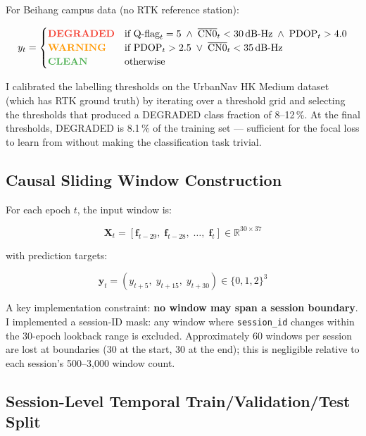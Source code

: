 \documentclass[12pt,a4paper]{article}
\newcommand{\code}[1]{\texttt{#1}}
\newcommand{\clean}[1]{\textcolor{cleanGreen}{\textbf{#1}}}
\newcommand{\warn}[1]{\textcolor{warnOrange}{\textbf{#1}}}
\newcommand{\degrad}[1]{\textcolor{degradRed}{\textbf{#1}}}
\begin{document}
For Beihang campus data (no RTK reference station):

\begin{equation}
  y_t = \begin{cases}
    \degrad{\text{DEGRADED}} &
    \text{if Q-flag}_t = 5 \;\land\;
    \overline{\text{CN0}}_t < 30\,\text{dB-Hz} \;\land\;
    \text{PDOP}_t > 4.0 \\
    \warn{\text{WARNING}} &
    \text{if PDOP}_t > 2.5 \;\lor\;
    \overline{\text{CN0}}_t < 35\,\text{dB-Hz} \\
    \clean{\text{CLEAN}} & \text{otherwise}
  \end{cases}
\end{equation}

I calibrated the labelling thresholds on the UrbanNav HK Medium dataset (which has RTK
ground truth) by iterating over a threshold grid and selecting the thresholds that
produced a DEGRADED class fraction of 8--12\,\%.
At the final thresholds, DEGRADED is 8.1\,\% of the training set --- sufficient for the
focal loss to learn from without making the classification task trivial.

\subsection{Causal Sliding Window Construction}

For each epoch $t$, the input window is:

\begin{equation}
  \mathbf{X}_t = [\mathbf{f}_{t-29},\; \mathbf{f}_{t-28},\; \ldots,\; \mathbf{f}_t]
  \in \mathbb{R}^{30 \times 37}
\end{equation}

with prediction targets:

\begin{equation}
  \mathbf{y}_t = (y_{t+5},\; y_{t+15},\; y_{t+30}) \in \{0, 1, 2\}^3
\end{equation}

A key implementation constraint: \textbf{no window may span a session boundary}.
I implemented a session-ID mask: any window where \code{session\_id} changes within the
30-epoch lookback range is excluded.
Approximately 60 windows per session are lost at boundaries (30 at the start, 30 at the
end); this is negligible relative to each session's 500--3,000 window count.

\subsection{Session-Level Temporal Train/Validation/Test Split}
\end{document}
